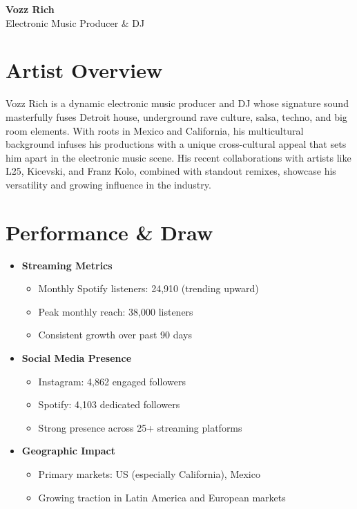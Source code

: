 \documentclass[11pt]{article}
\begin{document}
\begin{center}
{\Huge\textbf{Vozz Rich}}\\[0.5em]
{\large Electronic Music Producer \& DJ}\\[1em]
\end{center}

\section{ Artist Overview}
Vozz Rich is a dynamic electronic music producer and DJ whose signature sound masterfully fuses Detroit house, underground rave culture, salsa, techno, and big room elements. With roots in Mexico and California, his multicultural background infuses his productions with a unique cross-cultural appeal that sets him apart in the electronic music scene. His recent collaborations with artists like L25, Kicevski, and Franz Kolo, combined with standout remixes, showcase his versatility and growing influence in the industry.

\section{ Performance \& Draw}
\begin{itemize}[leftmargin=*]
\item \textbf{Streaming Metrics}
    \begin{itemize}
    \item Monthly Spotify listeners: 24,910 (trending upward)
    \item Peak monthly reach: 38,000 listeners
    \item Consistent growth over past 90 days
    \end{itemize}
\item \textbf{Social Media Presence}
    \begin{itemize}
    \item Instagram: 4,862 engaged followers
    \item Spotify: 4,103 dedicated followers
    \item Strong presence across 25+ streaming platforms
    \end{itemize}
\item \textbf{Geographic Impact}
    \begin{itemize}
    \item Primary markets: US (especially California), Mexico
    \item Growing traction in Latin America and European markets
    \end{itemize}
\end{itemize}
\end{document}
